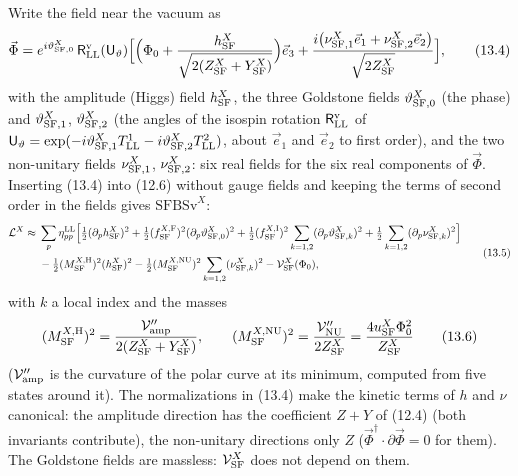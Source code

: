 \documentclass[
  10pt,
]{article}
\begin{document}
Write the field near the vacuum as
\[\vec\Phi=e^{i\vartheta^X_{{\rm SF},0}}\,\mathsf R^{\rm v}_{\rm LL}(\mathsf U_{\vartheta})\Big[\Big(\Phi_0+\frac{h^X_{\rm SF}}{\sqrt{2(Z^X_{\rm SF}+Y^X_{\rm SF})}}\Big)\vec e_3+\frac{i\big(\nu^X_{{\rm SF},1}\vec e_1+\nu^X_{{\rm SF},2}\vec e_2\big)}{\sqrt{2Z^X_{\rm SF}}}\Big],\tag{13.4}\]
with the amplitude (Higgs) field \(h^X_{\rm SF}\), the three Goldstone
fields \(\vartheta^X_{{\rm SF},0}\) (the phase) and
\(\vartheta^X_{{\rm SF},1}\), \(\vartheta^X_{{\rm SF},2}\) (the angles
of the isospin rotation \(\mathsf R^{\rm v}_{\rm LL}\) of
\(\mathsf U_\vartheta=\exp(-i\vartheta^X_{{\rm SF},1}T^1_{\rm LL}-i\vartheta^X_{{\rm SF},2}T^2_{\rm LL})\),
about \(\vec e_1\) and \(\vec e_2\) to first order), and the two
non-unitary fields \(\nu^X_{{\rm SF},1}\), \(\nu^X_{{\rm SF},2}\): six
real fields for the six real components of \(\vec\Phi\). Inserting
(13.4) into (12.6) without gauge fields and keeping the terms of second
order in the fields gives \(\mathrm{SFBSv}^X\):
\[\begin{aligned}\mathcal L^X\approx{}&\sum_p\eta^{\rm LL}_{pp}\Big[\tfrac12(\partial_ph^X_{\rm SF})^2+\tfrac12(f^{X,{\rm F}}_{\rm SF})^2(\partial_p\vartheta^X_{{\rm SF},0})^2+\tfrac12(f^{X,{\rm I}}_{\rm SF})^2\sum_{k=1,2}(\partial_p\vartheta^X_{{\rm SF},k})^2+\tfrac12\sum_{k=1,2}(\partial_p\nu^X_{{\rm SF},k})^2\Big]\\&-\tfrac12(M^{X,{\rm H}}_{\rm SF})^2(h^X_{\rm SF})^2-\tfrac12(M^{X,{\rm NU}}_{\rm SF})^2\sum_{k=1,2}(\nu^X_{{\rm SF},k})^2-\mathcal V^X_{\rm SF}(\Phi_0),\end{aligned}\tag{13.5}\]
with \(k\) a local index and the masses
\[(M^{X,{\rm H}}_{\rm SF})^2=\frac{\mathcal V''_{\rm amp}}{2(Z^X_{\rm SF}+Y^X_{\rm SF})},\qquad(M^{X,{\rm NU}}_{\rm SF})^2=\frac{\mathcal V''_{\rm NU}}{2Z^X_{\rm SF}}=\frac{4u^X_{\rm SF}\Phi_0^2}{Z^X_{\rm SF}}\tag{13.6}\]
(\(\mathcal V''_{\rm amp}\) is the curvature of the polar curve at its
minimum, computed from five states around it). The normalizations in
(13.4) make the kinetic terms of \(h\) and \(\nu\) canonical: the
amplitude direction has the coefficient \(Z+Y\) of (12.4) (both
invariants contribute), the non-unitary directions only \(Z\)
(\(\vec\Phi^\dagger\cdot\partial\vec\Phi=0\) for them). The Goldstone
fields are massless: \(\mathcal V^X_{\rm SF}\) does not depend on them.
\end{document}
